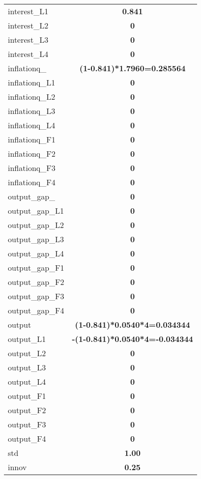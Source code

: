 \begin{tabular}{l|c}
\hline 
interest\_L1 & \textbf{0.841} \\ 
interest\_L2 & \textbf{0} \\ 
interest\_L3 & \textbf{0} \\ 
interest\_L4 & \textbf{0} \\ 
\hline 
inflationq\_ & \textbf{(1-0.841)*1.7960=0.285564} \\ 
inflationq\_L1 & \textbf{0} \\ 
inflationq\_L2 & \textbf{0} \\ 
inflationq\_L3 & \textbf{0} \\ 
inflationq\_L4 & \textbf{0} \\ 
inflationq\_F1 & \textbf{0} \\ 
inflationq\_F2 & \textbf{0} \\ 
inflationq\_F3 & \textbf{0} \\ 
inflationq\_F4 & \textbf{0} \\ 
\hline 
output\_gap\_ & \textbf{0} \\ 
output\_gap\_L1 & \textbf{0} \\ 
output\_gap\_L2 & \textbf{0} \\ 
output\_gap\_L3 & \textbf{0} \\ 
output\_gap\_L4 & \textbf{0} \\ 
output\_gap\_F1 & \textbf{0} \\ 
output\_gap\_F2 & \textbf{0} \\ 
output\_gap\_F3 & \textbf{0} \\ 
output\_gap\_F4 & \textbf{0} \\ 
\hline 
output & \textbf{(1-0.841)*0.0540*4=0.034344} \\ 
output\_L1 & \textbf{-(1-0.841)*0.0540*4=-0.034344} \\ 
output\_L2 & \textbf{0} \\ 
output\_L3 & \textbf{0} \\ 
output\_L4 & \textbf{0} \\ 
output\_F1 & \textbf{0} \\ 
output\_F2 & \textbf{0} \\ 
output\_F3 & \textbf{0} \\ 
output\_F4 & \textbf{0} \\ 
\hline 
std & \textbf{1.00} \\ 
innov & \textbf{0.25} \\ 
\hline 
\end{tabular}